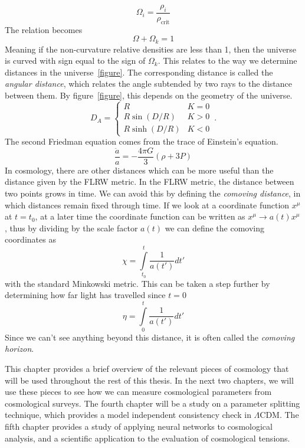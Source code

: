 \begin{equation}
    \Omega_i = \frac{\rho_i}{\rho_\mathrm{crit}}
\end{equation}
The relation becomes
\begin{equation}
    \Omega + \Omega_k = 1 
\end{equation}
Meaning if the non-curvature relative densities are less than 1, then the universe is curved with sign equal to the sign of $\Omega_k$. This relates to the way we determine distances in the universe~\ref{figure}. The corresponding distance is called the \textit{angular distance}, which relates the angle subtended by two rays to the distance between them. By figure~\ref{figure}, this depends on the geometry of the universe.
\begin{equation}
    D_A = \left\{ \begin{array}{cc}
        R & K=0 \\
        R\sin(D/R) & K>0 \\
        R\sinh(D/R) & K<0
    \end{array}
    \right.\,.
\end{equation}
The second Friedman equation comes from the trace of Einstein's equation.
\begin{equation}
    \frac{\ddot a}{a} = -\frac{4\pi G}{3}(\rho + 3P)
\end{equation}
In cosmology, there are other distances which can be more useful than the distance given by the FLRW metric. In the FLRW metric, the distance between two points grows in time. 
We can avoid this by defining the \textit{comoving distance}, in which distances remain fixed through time. 
If we look at a coordinate function $x^\mu$ at $t=t_0$, at a later time the coordinate function can be written as $x^\mu \rightarrow a(t) x^\mu$, thus by dividing by the scale factor $a(t)$ we can define the comoving coordinates as
\begin{equation}
    \chi = \int\limits^{t}_{t_0} \frac{1}{a(t')} dt'
\end{equation}
with the standard Minkowski metric. This can be taken a step further by determining how far light has travelled since $t=0$
\begin{equation}
    \eta = \int\limits^t_0 \frac{1}{a(t')}dt'
\end{equation}
Since we can't see anything beyond this distance, it is often called the \textit{comoving horizon}. 

This chapter provides a brief overview of the relevant pieces of cosmology that will be used throughout the rest of this thesis. In the next two chapters, we will use these pieces to see how we can measure cosmological parameters from cosmological surveys. The fourth chapter will be a study on a parameter splitting technique, which provides a model independent consistency check in $\Lambda$CDM. The fifth chapter provides a study of applying neural networks to cosmological analysis, and a scientific application to the evaluation of cosmological tensions.

